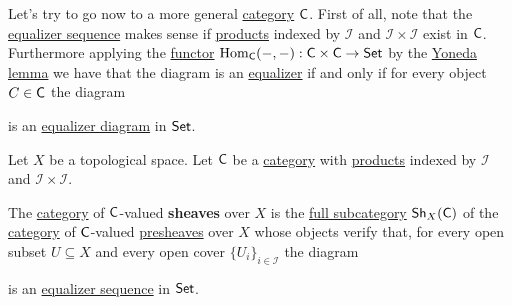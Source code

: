 \documentclass[../../../main]{subfiles}
\begin{document}
Let's try to go now to a more general \hyperref[def:category]{category} \(\mathsf{C}\).
First of all, note that the \hyperref[def:equaliser]{equalizer sequence} makes sense if \hyperref[def:categorical-product]{products} indexed by \(\mathcal{I}\) and \(\mathcal{I} \times \mathcal{I}\) exist in \(\mathsf{C}\).
Furthermore applying the \hyperref[def:functor]{functor} \(\operatorname{Hom}_{\mathsf{C}}(-, -): \mathsf{C} \times \mathsf{C} \to \mathsf{Set}\) by the \hyperref[thm:yoneda-lemma]{Yoneda lemma} we have that the diagram is an \hyperref[def:equaliser]{equalizer} if and only if for every object \(C \in \mathsf{C}\) the diagram
\begin{center}
\end{center}
is an \hyperref[def:equaliser]{equalizer diagram} in \(\mathsf{Set}\).

\begin{definition}[Sheaf] \label{def:sheaf}
  Let \(X\) be a topological space.
  Let \(\mathsf{C}\) be a \hyperref[def:category]{category} with \hyperref[def:categorical-product]{products} indexed by \(\mathcal{I}\) and \(\mathcal{I} \times \mathcal{I}\).

  The \hyperref[def:category]{category} of \(\mathsf{C}\)-valued \textbf{sheaves} over \(X\) is the \hyperref[def:subcategory]{full subcategory} \(\mathsf{Sh}_{X}(\mathsf{C})\) of the \hyperref[def:category]{category} of \(\mathsf{C}\)-valued \hyperref[def:presheaf]{presheaves} over \(X\) whose objects verify that, for every open subset \(U \subseteq X\) and every open cover \(\{U_{i}\}_{i \in \mathcal{I}}\) the diagram
  \begin{center}
  \end{center}
  is an \hyperref[def:equaliser]{equalizer sequence} in \(\mathsf{Set}\).
\end{definition}
\end{document}
